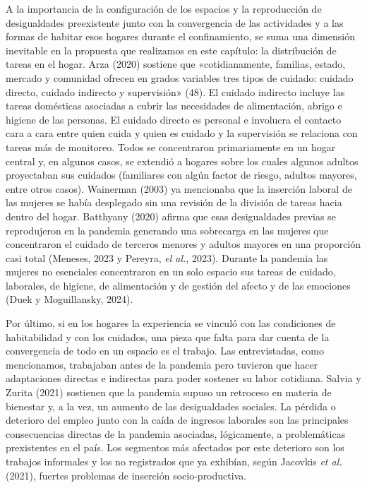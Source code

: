 A la importancia de la configuración de los espacios y la reproducción de desigualdades preexistente junto con la convergencia de las actividades y a las formas de habitar esos hogares durante el confinamiento, se suma una dimensión inevitable en la propuesta que realizamos en este capítulo: la distribución de tareas en el hogar. Arza (2020) sostiene que «cotidianamente, familias, estado, mercado y comunidad ofrecen en grados variables tres tipos de cuidado: cuidado directo, cuidado indirecto y supervisión» (48). El cuidado indirecto incluye las tareas domésticas asociadas a cubrir las necesidades de alimentación, abrigo e higiene de las personas. El cuidado directo es personal e involucra el contacto cara a cara entre quien cuida y quien es cuidado y la supervisión se relaciona con tareas más de monitoreo. Todos se concentraron primariamente en un hogar central y, en algunos casos, se extendió a hogares sobre los cuales algunos adultos proyectaban sus cuidados (familiares con algún factor de riesgo, adultos mayores, entre otros casos). Wainerman (2003) ya mencionaba que la inserción laboral de las mujeres se había desplegado sin una revisión de la división de tareas hacia dentro del hogar. Batthyany (2020) afirma que esas desigualdades previas se reprodujeron en la pandemia generando una sobrecarga en las mujeres que concentraron el cuidado de terceros menores y adultos mayores en una proporción casi total (Meneses, 2023 y Pereyra, \emph{el al.}, 2023). Durante la pandemia las mujeres no esenciales concentraron en un solo espacio sus tareas de cuidado, laborales, de higiene, de alimentación y de gestión del afecto y de las emociones (Duek y Moguillansky, 2024).

Por último, si en los hogares la experiencia se vinculó con las condiciones de habitabilidad y con los cuidados, una pieza que falta para dar cuenta de la convergencia de todo en un espacio es el trabajo. Las entrevistadas, como mencionamos, trabajaban antes de la pandemia pero tuvieron que hacer adaptaciones directas e indirectas para poder sostener su labor cotidiana. Salvia y Zurita (2021) sostienen que la pandemia supuso un retroceso en materia de bienestar y, a la vez, un aumento de las desigualdades sociales. La pérdida o deterioro del empleo junto con la caída de ingresos laborales son las principales consecuencias directas de la pandemia asociadas, lógicamente, a problemáticas prexistentes en el país. Los segmentos más afectados por este deterioro son los trabajos informales y los no registrados que ya exhibían, según Jacovkis \emph{et al.} (2021), fuertes problemas de inserción socio-productiva.

